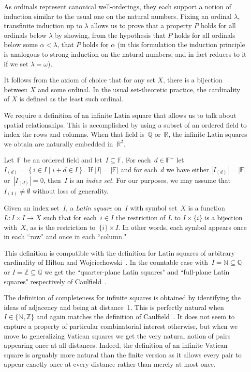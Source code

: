 \documentclass[12pt,a4paper]{article}
\newcommand{\Z}{\mathbb{Z}}
\newcommand{\N}{\mathbb{N}}
\newcommand{\R}{\mathbb{R}}
\newcommand{\Q}{\mathbb{Q}}
\newcommand{\F}{\mathbb{F}}
\newcommand{\st}{\; | \;}
\newcommand{\set}[2]{\left\{#1\st #2 \right\}}
\begin{document}
As ordinals represent canonical well-orderings, they each support a notion of induction similar to the usual one on the natural numbers. Fixing an ordinal $\lambda$, transfinite induction up to $\lambda$ allows us to prove that a property $P$ holds for all ordinals below $\lambda$ by showing, from the hypothesis that $P$ holds for all ordinals below some $\alpha<\lambda$, that $P$ holds for $\alpha$ (in this formulation
the induction principle is analogous to strong induction on the natural numbers, and in fact reduces to it if we set $\lambda=\omega$).

It follows from the axiom of choice that for any set $X$, there is a bijection between $X$ and some ordinal. In the usual set-theoretic practice, the cardinality of $X$ is defined as the least such ordinal. 

We require a definition of an infinite Latin square that allows us to talk about spatial relationships.  This is accomplished by using a subset of an ordered field to index the rows and columns.  When that field is~$\Q$ or~$\R$, the infinite Latin squares we obtain are naturally embedded in~$\R^2$.

Let~$\F$ be an ordered field and let~$I \subseteq \F$.   For each~$d \in \F^+$ let~$I_{(d)} = \set{ i \in I }{  i+d \in I }$.  If $|I| = |\F|$ and for each~$d$ we have either $|I_{(d)}| = |\F|$ or~$|I_{(d)}| = 0$, then~$I$ is an {\em index set}.   For our purposes, we may assume that~$I_{(1)} \neq \emptyset$ without loss of generality.

Given an index set~$I$, a {\em Latin square} on~$I$ with symbol set~$X$ is a function $L: I \times I \rightarrow X$ such that for each~$i \in I$ the restriction of $L$ to $I \times \{i\}$ is a bijection with~$X$, as is the restriction to~$\{i\} \times I$.   In other words, each symbol appears once in each ``row" and once in each ``column."  

This definition is  compatible with the definition for Latin squares of arbitrary cardinality of Hilton and Wojciechowski~\cite{HW05}.  In the countable case with~$I = \N \subseteq \Q$ or $I = \Z \subseteq \Q$ we get the ``quarter-plane Latin squares" and ``full-plane Latin squares" respectively of Caulfield~\cite{Caulfield96}.




The definition of completeness for infinite squares is obtained by identifying the ideas of adjacency and being at distance~1.  This is perfectly natural when~$I \in \{ \N ,\Z\}$ and again matches the definition of Caulfield~\cite{Caulfield96}.   It does not seem to capture a property of particular combinatorial interest otherwise, but when we move to generalizing Vatican squares we get the very natural notion of pairs appearing once at all distances.  Indeed, the definition of an infinite Vatican square is arguably more natural than the finite version as it allows every pair to appear exactly once at every distance rather than merely at most once.
\end{document}
